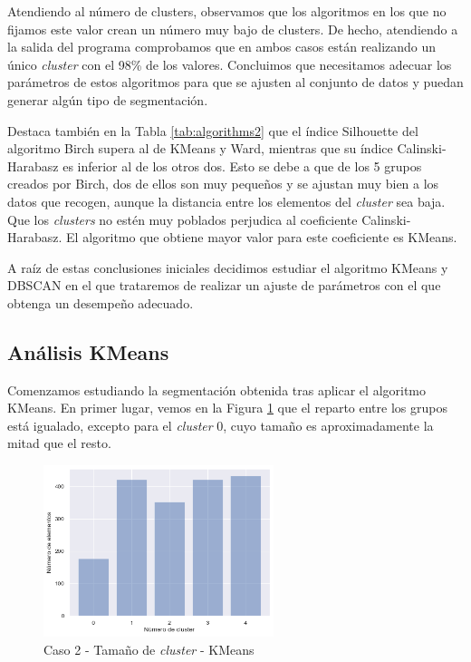 \documentclass[a4paper, 20pt]{article}
\begin{document}
Atendiendo al número de clusters, observamos que los algoritmos en los que no fijamos este valor crean un número muy bajo de clusters. De hecho, atendiendo a la salida del programa comprobamos que en ambos casos están realizando un único \textit{cluster} con el 98\% de los valores. Concluimos que necesitamos adecuar los parámetros de estos algoritmos para que se ajusten al conjunto de datos y puedan generar algún tipo de segmentación.

Destaca también en la Tabla \ref{tab:algorithms2} que el índice Silhouette del algoritmo Birch supera al de KMeans y Ward, mientras que su índice Calinski-Harabasz es inferior al de los otros dos. Esto se debe a que de los 5 grupos creados por Birch, dos de ellos son muy pequeños y se ajustan muy bien a los datos que recogen, aunque la distancia entre los elementos del \textit{cluster} sea baja. Que los \textit{clusters} no estén muy poblados perjudica al coeficiente Calinski-Harabasz. El algoritmo que obtiene mayor valor para este coeficiente es KMeans.

A raíz de estas conclusiones iniciales decidimos estudiar el algoritmo KMeans y DBSCAN en el que trataremos de realizar un ajuste de parámetros con el que obtenga un desempeño adecuado.

\subsection{Análisis KMeans}

Comenzamos estudiando la segmentación obtenida tras aplicar el algoritmo KMeans. En primer lugar, vemos en la Figura \ref{fig:KMeans_tam2} que el reparto entre los grupos está igualado, excepto para el \textit{cluster} 0, cuyo tamaño es aproximadamente la mitad que el resto.

\begin{figure}[H]
    \centering
    \includegraphics[width=0.6\textwidth]{./caso2/KMeans_tam_clusters}
    \caption{Caso 2 - Tamaño de \textit{cluster} - KMeans}
    \label{fig:KMeans_tam2}
\end{figure}
\end{document}
